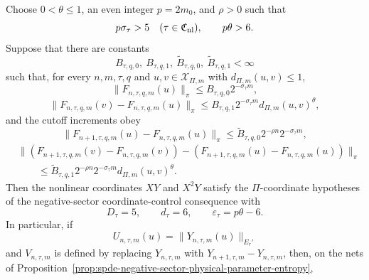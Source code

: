 \begin{proposition}
Choose \(0<\theta\leq1\), an even integer \(p=2m_0\), and \(\rho>0\) such
that
\begin{equation}
  p\sigma_\tau>5
  \quad(\tau\in\mathfrak C_{\rm nl}),
  \qquad
  p\theta>6 .
  \label{eq:spde-nonlinear-pi-coordinate-moment-condition}
\end{equation}
Suppose that there are constants
\[
  B_{\tau,q,0},\ B_{\tau,q,1},\
  \widetilde B_{\tau,q,0},\ \widetilde B_{\tau,q,1}<\infty
\]
such that, for every \(n,m,\tau,q\) and \(u,v\in\mathcal X_{\Pi,m}\) with
\(d_{\Pi,m}(u,v)\leq1\),
\begin{equation}
  \|F_{n,\tau,q,m}(u)\|_\pi
  \leq
  B_{\tau,q,0}2^{-\sigma_\tau m},
  \label{eq:spde-nonlinear-pi-coordinate-projective-base}
\end{equation}
\begin{equation}
  \|F_{n,\tau,q,m}(v)-F_{n,\tau,q,m}(u)\|_\pi
  \leq
  B_{\tau,q,1}2^{-\sigma_\tau m}d_{\Pi,m}(u,v)^\theta,
  \label{eq:spde-nonlinear-pi-coordinate-projective-edge}
\end{equation}
and the cutoff increments obey
\begin{equation}
  \|F_{n+1,\tau,q,m}(u)-F_{n,\tau,q,m}(u)\|_\pi
  \leq
  \widetilde B_{\tau,q,0}2^{-\rho n}2^{-\sigma_\tau m},
  \label{eq:spde-nonlinear-pi-coordinate-projective-cutoff-base}
\end{equation}
\begin{equation}
\begin{aligned}
  &\|
    (F_{n+1,\tau,q,m}(v)-F_{n,\tau,q,m}(v))
    -(F_{n+1,\tau,q,m}(u)-F_{n,\tau,q,m}(u))
  \|_\pi                                             \\
  &\qquad\leq
  \widetilde B_{\tau,q,1}2^{-\rho n}
  2^{-\sigma_\tau m}d_{\Pi,m}(u,v)^\theta .
\end{aligned}
  \label{eq:spde-nonlinear-pi-coordinate-projective-cutoff-edge}
\end{equation}
Then the nonlinear coordinates \(XY\) and \(X^2Y\) satisfy the
\(\Pi\)-coordinate hypotheses of
the negative-sector coordinate-control consequence with
\begin{equation}
  D_\tau=5,\qquad d_\tau=6,\qquad
  \varepsilon_\tau=p\theta-6 .
  \label{eq:spde-nonlinear-pi-coordinate-entropy-data}
\end{equation}
In particular, if
\[
  U_{n,\tau,m}(u)=\|Y_{n,\tau,m}(u)\|_{E_r'}
\]
and \(V_{n,\tau,m}\) is defined by replacing \(Y_{n,\tau,m}\) with
\(Y_{n+1,\tau,m}-Y_{n,\tau,m}\), then, on the nets of
Proposition~\ref{prop:spde-negative-sector-physical-parameter-entropy},

\end{proposition}
